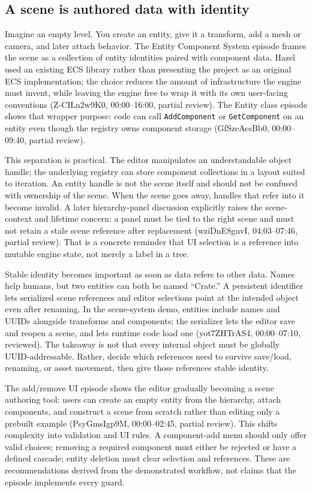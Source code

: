 \subsection{A scene is authored data with identity}\label{06-engine-ii-ch032-a-scene-is-authored-data-with-identity}

Imagine an empty level. You create an entity, give it a transform, add a mesh or camera, and later attach behavior. The Entity Component System episode frames the scene as a collection of entity identities paired with component data. Hazel used an existing ECS library rather than presenting the project as an original ECS implementation; the choice reduces the amount of infrastructure the engine must invent, while leaving the engine free to wrap it with its own user-facing conventions (Z-CILn2w9K0, 00:00--16:00, partial review). The Entity class episode shows that wrapper purpose: code can call \texttt{AddComponent} or \texttt{GetComponent} on an entity even though the registry owns component storage (GfSzeAcsBb0, 00:00--09:40, partial review).

This separation is practical. The editor manipulates an understandable object handle; the underlying registry can store component collections in a layout suited to iteration. An entity handle is not the scene itself and should not be confused with ownership of the scene. When the scene goes away, handles that refer into it become invalid. A later hierarchy-panel discussion explicitly raises the scene-context and lifetime concern: a panel must be tied to the right scene and must not retain a stale scene reference after replacement (wziDnE8guvI, 04:03--07:46, partial review). That is a concrete reminder that UI selection is a reference into mutable engine state, not merely a label in a tree.

Stable identity becomes important as soon as data refers to other data. Names help humans, but two entities can both be named ``Crate.'' A persistent identifier lets serialized scene references and editor selections point at the intended object even after renaming. In the scene-system demo, entities include names and UUIDs alongside transforms and components; the serializer lets the editor save and reopen a scene, and lets runtime code load one (yot7ZHTrAS4, 00:00--07:10, reviewed). The takeaway is not that every internal object must be globally UUID-addressable. Rather, decide which references need to survive save/load, renaming, or asset movement, then give those references stable identity.

The add/remove UI episode shows the editor gradually becoming a scene authoring tool: users can create an empty entity from the hierarchy, attach components, and construct a scene from scratch rather than editing only a prebuilt example (PsyGmsIgp9M, 00:00--02:45, partial review). This shifts complexity into validation and UI rules. A component-add menu should only offer valid choices; removing a required component must either be rejected or have a defined cascade; entity deletion must clear selection and references. These are recommendations derived from the demonstrated workflow, not claims that the episode implements every guard.

